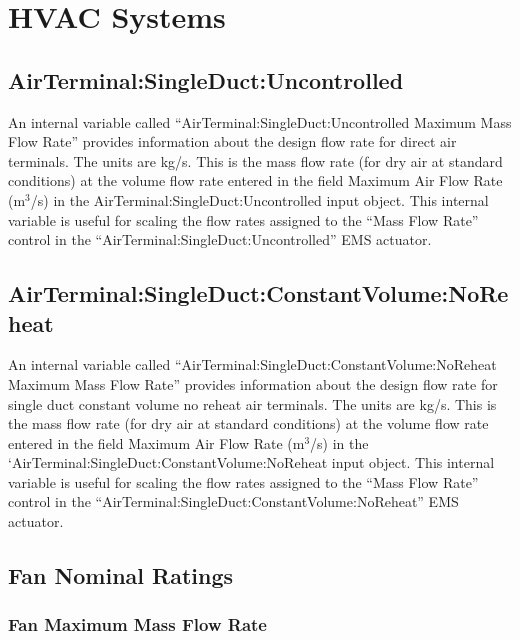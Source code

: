 \section{HVAC Systems}\label{hvac-systems-000}

\subsection{AirTerminal:SingleDuct:Uncontrolled}\label{airterminalsingleductuncontrolled-000}

An internal variable called ``AirTerminal:SingleDuct:Uncontrolled Maximum Mass Flow Rate'' provides information about the design flow rate for direct air terminals. The units are kg/s. This is the mass flow rate (for dry air at standard conditions) at the volume flow rate entered in the field Maximum Air Flow Rate (m\(^{3}\)/s) in the AirTerminal:SingleDuct:Uncontrolled input object. This internal variable is useful for scaling the flow rates assigned to the ``Mass Flow Rate'' control in the ``AirTerminal:SingleDuct:Uncontrolled'' EMS actuator.

\subsection{AirTerminal:SingleDuct:ConstantVolume:NoReheat}\label{airTerminalsingleductconstantvolumenoreheat-000}

An internal variable called ``AirTerminal:SingleDuct:ConstantVolume:NoReheat Maximum Mass Flow Rate'' provides information about the design flow rate for single duct constant volume no reheat air terminals. The units are kg/s. This is the mass flow rate (for dry air at standard conditions) at the volume flow rate entered in the field Maximum Air Flow Rate (m\(^{3}\)/s) in the `AirTerminal:SingleDuct:ConstantVolume:NoReheat input object. This internal variable is useful for scaling the flow rates assigned to the ``Mass Flow Rate'' control in the ``AirTerminal:SingleDuct:ConstantVolume:NoReheat'' EMS actuator.

\subsection{Fan Nominal Ratings}\label{fan-nominal-ratings}

\subsubsection{Fan Maximum Mass Flow Rate}\label{fan-maximum-mass-flow-rate}

